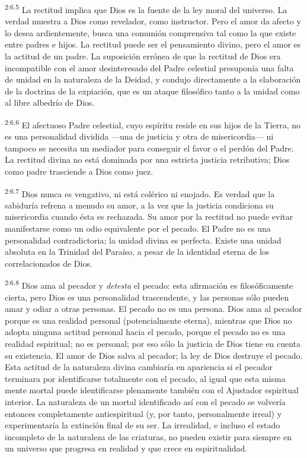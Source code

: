 \par
\textsuperscript{2:6.5} La rectitud implica que Dios es la fuente de la ley moral del universo. La verdad muestra a Dios como revelador, como instructor. Pero el amor da afecto y lo desea ardientemente, busca una comunión comprensiva tal como la que existe entre padres e hijos. La rectitud puede ser el pensamiento divino, pero el amor es la actitud de un padre. La suposición errónea de que la rectitud de Dios era incompatible con el amor desinteresado del Padre celestial presuponía una falta de unidad en la naturaleza de la Deidad, y condujo directamente a la elaboración de la doctrina de la expiación, que es un ataque filosófico tanto a la unidad como al libre albedrío de Dios.

\par
\textsuperscript{2:6.6} El afectuoso Padre celestial, cuyo espíritu reside en sus hijos de la Tierra, no es una personalidad dividida ---una de justicia y otra de misericordia--- ni tampoco se necesita un mediador para conseguir el favor o el perdón del Padre. La rectitud divina no está dominada por una estricta justicia retributiva; Dios como padre trasciende a Dios como juez.

\par
\textsuperscript{2:6.7} Dios nunca es vengativo, ni está colérico ni enojado. Es verdad que la sabiduría refrena a menudo su amor, a la vez que la justicia condiciona su misericordia cuando ésta es rechazada. Su amor por la rectitud no puede evitar manifestarse como un odio equivalente por el pecado. El Padre no es una personalidad contradictoria; la unidad divina es perfecta. Existe una unidad absoluta en la Trinidad del Paraíso, a pesar de la identidad eterna de los correlacionados de Dios.

\par
\textsuperscript{2:6.8} Dios ama al pecador y \textit{detesta} el pecado: esta afirmación es filosóficamente cierta, pero Dios es una personalidad trascendente, y las personas sólo pueden amar y odiar a otras personas. El pecado no es una persona. Dios ama al pecador porque es una realidad personal (potencialmente eterna), mientras que Dios no adopta ninguna actitud personal hacia el pecado, porque el pecado no es una realidad espiritual; no es personal; por eso sólo la justicia de Dios tiene en cuenta su existencia. El amor de Dios salva al pecador; la ley de Dios destruye el pecado. Esta actitud de la naturaleza divina cambiaría en apariencia si el pecador terminara por identificarse totalmente con el pecado, al igual que esta misma mente mortal puede identificarse plenamente también con el Ajustador espiritual interior. La naturaleza de un mortal identificado así con el pecado se volvería entonces completamente antiespiritual (y, por tanto, personalmente irreal) y experimentaría la extinción final de su ser. La irrealidad, e incluso el estado incompleto de la naturaleza de las criaturas, no pueden existir para siempre en un universo que progresa en realidad y que crece en espiritualidad.

